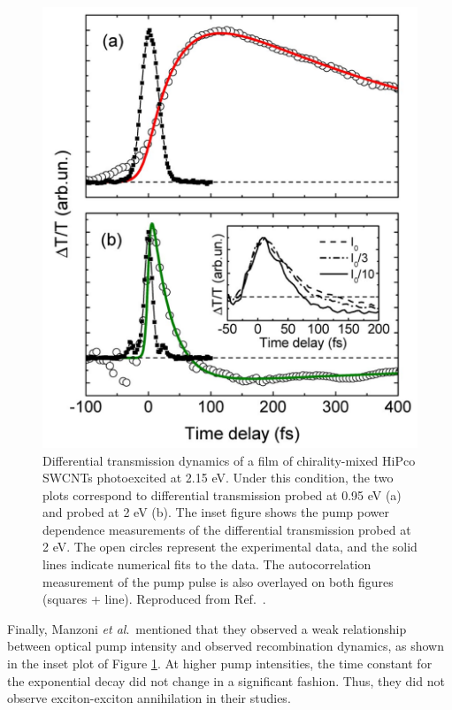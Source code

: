 \begin{figure}[H]
	\centering
	\includegraphics[scale=0.3]{images/chapter_prior_works/e22_pump_probe_manzoni}
	\caption{Differential transmission dynamics of a film of chirality-mixed HiPco SWCNTs photoexcited at 2.15 eV. Under this condition, the two plots correspond to differential transmission probed at 0.95 eV (a) and probed at 2 eV (b). The inset figure shows the pump power dependence measurements of the differential transmission probed at 2 eV. The open circles represent the experimental data, and the solid lines indicate numerical fits to the data. The autocorrelation measurement of the pump pulse is also overlayed on both figures (squares + line). Reproduced from Ref.\ \cite{manzoni2005intersubband}.}
	\label{fig:e22_pump_manzoni}
\end{figure}

Finally, Manzoni \textit{et al}.\ mentioned that they observed a weak relationship between optical pump intensity and observed recombination dynamics, as shown in the inset plot of Figure \ref{fig:e22_pump_manzoni}. At higher pump intensities, the time constant for the exponential decay did not change in a significant fashion. Thus, they did not observe exciton-exciton annihilation in their studies.

